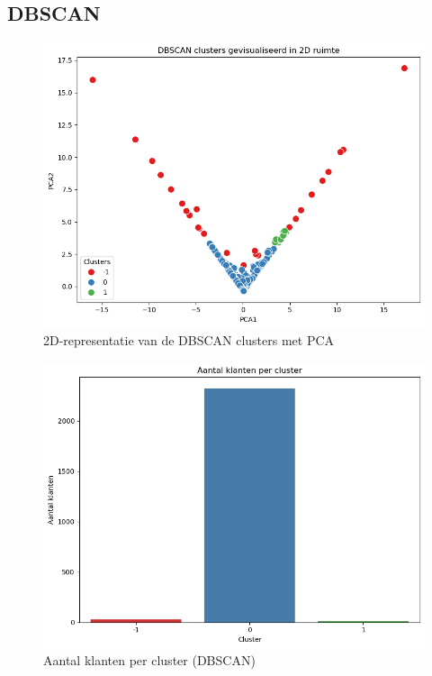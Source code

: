 \subsection*{DBSCAN}

\begin{figure}[H]
    \centering
    \includegraphics[width=0.8\linewidth]{images/DBSCAN/AnalyseDBSCAN}
    \caption{2D-representatie van de DBSCAN clusters met PCA}
    \label{fig:PCA_DBSCAN}
\end{figure}

\begin{figure}[H]
    \centering
    \includegraphics[width=0.8\linewidth]{images/DBSCAN/AantalKlantenDBSCAN}
    \caption{Aantal klanten per cluster (DBSCAN)}
    \label{fig:Klanten_DBSCAN}
\end{figure}

